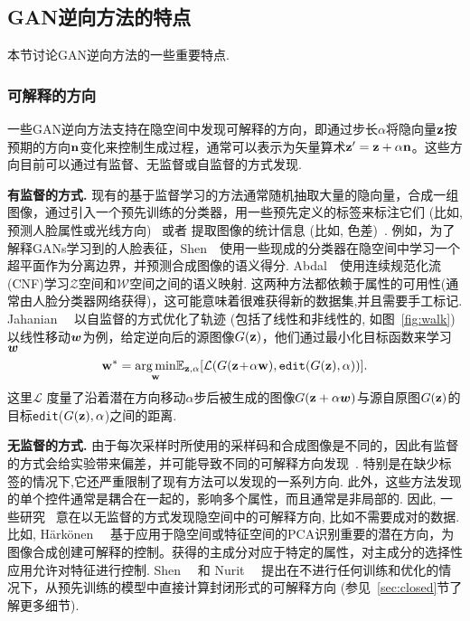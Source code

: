 \subsection{GAN逆向方法的特点}
\label{sec:characteristics}

本节讨论GAN逆向方法的一些重要特点. 

\subsubsection{可解释的方向}
\label{sec:interpretable-directions}

一些GAN逆向方法支持在隐空间中发现可解释的方向，即通过步长$\alpha$将隐向量$\mathbf{z}$按预期的方向$\mathbf{n}$变化来控制生成过程，通常可以表示为矢量算术$\mathbf{z}^{\prime}=\mathbf{z}+\alpha\mathbf{n}$。这些方向目前可以通过有监督、无监督或自监督的方式发现.

\noindent\textbf{有监督的方式.} 
现有的基于监督学习的方法通常随机抽取大量的隐向量，合成一组图像，通过引入一个预先训练的分类器，用一些预先定义的标签来标注它们 (比如,预测人脸属性或光线方向)~\cite{goetschalckx2019ganalyze,shen2020interpreting,abdal2020styleflow,jahanian2020steerability} 或者 提取图像的统计信息 (比如, 色差)~\cite{plumerault2020control}.
例如，为了解释GANs学习到的人脸表征，Shen~\etal~\cite{shen2020interpreting}使用一些现成的分类器在隐空间中学习一个超平面作为分离边界，并预测合成图像的语义得分.
Abdal~\etal~\cite{abdal2020styleflow}使用连续规范化流(CNF)学习$\mathcal{Z}$空间和$\mathcal{W}$空间之间的语义映射.
这两种方法都依赖于属性的可用性(通常由人脸分类器网络获得)，这可能意味着很难获得新的数据集,并且需要手工标记.
Jahanian~\etal~\cite{jahanian2020steerability} 以自监督的方式优化了轨迹 (包括了线性和非线性的, 如图~\ref{fig:walk}) 
以线性移动$\boldsymbol{w}$为例，给定逆向后的源图像$G(\mathbf{z})$，他们通过最小化目标函数来学习$\boldsymbol{w}$
\begin{equation}
\w^* = \underset{\w}{\arg\min} {\E}_{\z,\alpha} [\mathcal{L} ( G(\z\!+\!\alpha \w), \texttt{edit}(G(\z), \alpha))].
\label{eq:optimal_w}
\end{equation}
这里$\mathcal{L}$ 度量了沿着潜在方向移动$\alpha$步后被生成的图像$G(\mathbf{z}+\alpha \boldsymbol{w})$与源自原图$G(\mathbf{z})$的目标\texttt{edit}($G(\mathbf{z}), \alpha$)之间的距离.

\figwalk

\noindent\textbf{无监督的方式.} 
由于每次采样时所使用的采样码和合成图像是不同的，因此有监督的方式会给实验带来偏差，并可能导致不同的可解释方向发现~\cite{shen2020closedform}. 
特别是在缺少标签的情况下,它还严重限制了现有方法可以发现的一系列方向. 
此外，这些方法发现的单个控件通常是耦合在一起的，影响多个属性，而且通常是非局部的.
因此, 一些研究~\cite{voynov2020latent,lu2020discovery,eric2020GANSpace,cherepkov2020navigating} 意在以无监督的方式发现隐空间中的可解释方向, 比如不需要成对的数据.
比如, Härkönen~\etal~\cite{eric2020GANSpace} 基于应用于隐空间或特征空间的PCA识别重要的潜在方向，为图像合成创建可解释的控制。获得的主成分对应于特定的属性，对主成分的选择性应用允许对特征进行控制.
Shen~\etal~\cite{shen2020closedform} 和 Nurit~\etal~\cite{nurit2020steerability} 提出在不进行任何训练和优化的情况下，从预先训练的模型中直接计算封闭形式的可解释方向 (参见~\ref{sec:closed}节了解更多细节).

